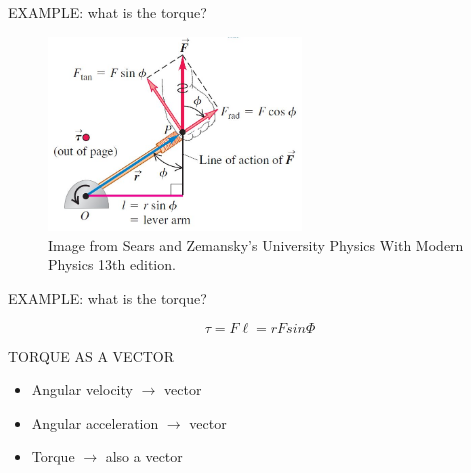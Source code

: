 \documentclass[]{beamer}
\begin{document}





\begin{frame}

EXAMPLE: what is the torque?
\vspace{7mm}


\begin{figure}[h!]  
  \includegraphics[width=0.6\textwidth]{images/3.jpg}
  \caption{Image from Sears and Zemansky's University Physics With Modern Physics 13th edition. }

\end{figure}

    
\end{frame}






\begin{frame}

  EXAMPLE: what is the torque?
  \vspace{7mm}
  

  \begin{equation}
    \boxed{\tau=F\ell=rFsin\Phi}
  \end{equation}
      
  \end{frame}
  
  
  

  \begin{frame}

   TORQUE AS A VECTOR
   
   \vspace{7mm}

\begin{itemize}
  \item Angular velocity $\rightarrow$ vector
   \pause
  \item Angular acceleration $\rightarrow$ vector
  \pause
  \item Torque $\rightarrow$ also a vector
\end{itemize}


  \end{frame}
    
\end{document}
